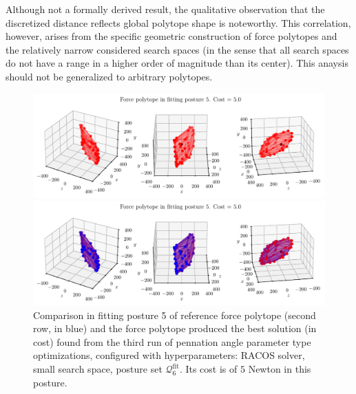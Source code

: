 Although not a formally derived result, the qualitative observation that the discretized distance reflects global polytope shape is noteworthy. This correlation, however, arises from the specific geometric construction of force polytopes and the relatively narrow considered search spaces (in the sense that all search spaces do not have a range in a higher order of magnitude than its center). This anaysis should not be generalized to arbitrary polytopes.

\begin{figure}[!htb]
    \centering
    \captionsetup{justification=centering}
    
    \begin{minipage}{0.8\linewidth}
        \captionsetup{justification=centering}
        \centering
        \includegraphics[trim={0 0 0 0}, clip, width=1\linewidth]{img/chapter_4/reconstruction_stanford_imgs/polytope_racos_p6_pen_small_output_3207074_trial_3_fitting_posture_5.pdf}
    \end{minipage}
    \begin{minipage}{0.8\linewidth}
        \captionsetup{justification=centering}
        \centering
        \includegraphics[trim={0 0 0 20}, clip, width=1\linewidth]{img/chapter_4/reconstruction_stanford_imgs/polytope_racos_p6_pen_small_output_3207074_trial_3_fitting_posture_5_with_stanford.pdf}
    \end{minipage}
    \caption{Comparison in fitting posture 5 of reference force polytope (second row, in blue) and the force polytope produced the best solution (in cost) found from the third run of pennation angle parameter type optimizations, configured with hyperparameters: RACOS solver, small search space, posture set $\mathcal{Q}_6^{\text{fit}}$. Its cost is of $5$ Newton in this posture.}
    \label{fig:polytope_racos_p6_pen_small_output_3207074_trial_3_fitting_posture_5}
\end{figure}


